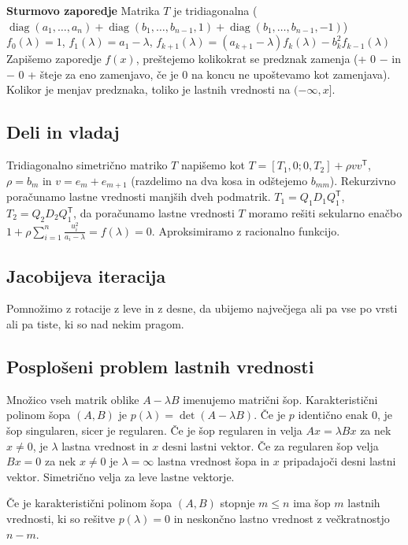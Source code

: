 \documentclass[a4paper,10pt]{article}
\theoremstyle{definition}
\newcommand{\T}{\mathsf{T}\!}
\DeclareMathOperator{\diag}{diag}
\begin{document}
\textbf{Sturmovo zaporedje}
Matrika $T$ je tridiagonalna
($\diag(a_1,\dots,a_n)+\diag(b_1,\dots,b_{n-1},1)+\diag(b_1,\dots,b_{n-1},-1)$)\\
$f_0(\lambda)=1$, $f_1(\lambda)=a_1-\lambda$,
$f_{k+1}(\lambda)=(a_{k+1}-\lambda)f_k(\lambda)-b_k^2f_{k-1}(\lambda)$\\
Zapišemo zaporedje $f(x)$, preštejemo kolikokrat se predznak zamenja
(+ 0 $-$ in $-$ 0 + šteje za eno zamenjavo, če je 0 na koncu ne upoštevamo
kot zamenjava). Kolikor je menjav predznaka, toliko je lastnih
vrednosti na $(-\infty, x]$.

\subsection*{Deli in vladaj}
Tridiagonalno simetrično matriko $T$ napišemo kot $T = [T_1, 0; 0, T_2] + \rho
vv^\T$, $\rho = b_m$ in $v = e_m + e_{m+1}$ (razdelimo na dva kosa in odštejemo
$b_{mm}$). Rekurzivno poračunamo lastne vrednosti manjših dveh podmatrik.
$T_1 = Q_1D_1Q_1^\T$, $T_2 = Q_2D_2Q_1^\T$, da poračunamo lastne vrednosti
$T$ moramo rešiti sekularno enačbo $1 + \rho \sum_{i=1}^n \frac{u_i^2}{a_i -
\lambda} = f(\lambda) = 0$. Aproksimiramo z racionalno funkcijo.

\subsection*{Jacobijeva iteracija}
Pomnožimo z rotacije z leve in z desne, da ubijemo največjega ali pa vse po
vrsti ali pa tiste, ki so nad nekim pragom.

\subsection*{Posplošeni problem lastnih vrednosti}

Množico vseh matrik oblike $A-\lambda B$ imenujemo matrični šop. Karakteristični
polinom šopa $(A,B)$ je $p(\lambda)=\det (A-\lambda B)$. Če je $p$ identično
enak $0$, je šop singularen, sicer je regularen.
Če je šop regularen in velja $Ax = \lambda Bx$  za nek $x\not=0$, je $\lambda$
lastna vrednost in $x$ desni lastni vektor. Če za regularen šop velja $Bx=0$ za
nek $x\not=0$ je $\lambda=\infty$ lastna vrednost šopa in $x$ pripadajoči desni
lastni vektor.
Simetrično velja za leve lastne vektorje.

Če je karakteristični polinom šopa $(A, B)$ stopnje $m\leq n$ ima šop $m$ lastnih
vrednosti, ki so rešitve $p(\lambda)=0$ in neskončno lastno vrednost z
večkratnostjo $n-m$.
\end{document}
